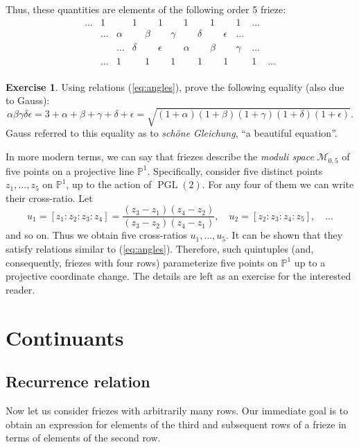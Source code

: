 \documentclass[a4paper,11pt]{amsart}
\newcommand{\PP}{{\mathbb{P}}}
\newcommand{\PGL}{\mathop{\mathrm{PGL}}}
\theoremstyle{plain}
\theoremstyle{remark}
\theoremstyle{definition}
\newtheorem{exercise}[theorem]{Exercise}
\numberwithin{equation}{section}
\numberwithin{figure}{section}
\begin{document}
Thus, these quantities are elements of the following order 5 frieze:
\[
\begin{array}{ccccccccccccccccccccc}
\dots &1 && 1&& 1&& 1&& 1&& 1& \dots\\
&\dots & \alpha && \beta  && \gamma && \delta &&\epsilon &\dots\\ 
&&\dots & \delta && \epsilon && \alpha &&\beta &&\gamma & \dots\\
&\dots & 1&& 1&& 1&& 1&& 1&& 1& \dots\\
\end{array}
\]

\begin{exercise} Using relations (\ref{eq:angles}), prove the following equality (also due to Gauss):
\[
\alpha\beta\gamma\delta\epsilon = 3+\alpha+\beta+\gamma+\delta+\epsilon=\sqrt{(1+\alpha)(1+\beta)(1+\gamma)(1+\delta)(1+\epsilon)}.
\]
Gauss referred to this equality as to \emph{sch\"one Gleichung}, ``a beautiful equation''.
\end{exercise}

\begin{small}
In more modern terms, we can say that friezes describe the \emph{moduli space} $\mathcal{M}_{0,5}$ of five points on a projective line $\PP^1$. Specifically, consider five distinct points $z_1,\dots,z_5$ on $\PP^1$, up to the action of $\PGL(2)$. For any four of them we can write their cross-ratio. Let
\[
u_1=[z_1:z_2:z_3:z_4]=\frac{(z_3-z_1)(z_4-z_2)}{(z_3-z_2)(z_4-z_1)},\quad u_2=[z_2:z_3:z_4:z_5],\quad\dots
\]
and so on. Thus we obtain five cross-ratios $u_1,\dots,u_5$. It can be shown that they satisfy relations similar to (\ref{eq:angles}). Therefore, such quintuples (and, consequently, friezes with four rows) parameterize five points on $\PP^1$ up to a projective coordinate change. The details are left as an exercise for the interested reader.
\end{small}




\section{Continuants}

\subsection{Recurrence relation}\label{ssec:rec}

Now let us consider friezes with arbitrarily many rows. Our immediate goal is to obtain an expression for elements of the third and subsequent rows of a frieze in terms of elements of the second row.
\end{document}
